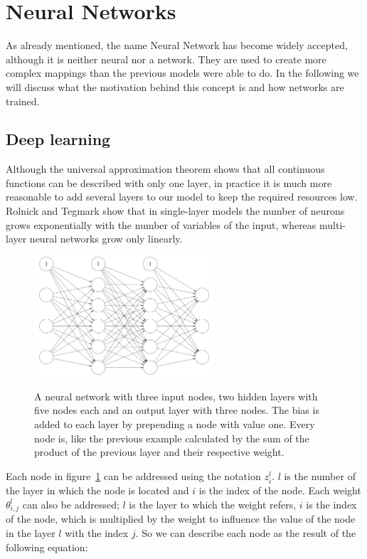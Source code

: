 \section{Neural Networks} \label{ch:neural_networks}

As already mentioned, the name Neural Network has become widely accepted, although it is neither neural nor a network.
They are used to create more complex mappings than the previous models were able to do.
In the following we will discuss what the motivation behind this concept is and how networks are trained.

\subsection{Deep learning} \label{ch:deep_learning}

Although the universal approximation theorem shows that all continuous functions can be described with only one layer, in practice it is much more reasonable to add several layers to our model to keep the required resources low.
Rolnick and Tegmark \cite{Rolnick2017} show that in single-layer models the number of neurons grows exponentially with the number of variables of the input, whereas multi-layer neural networks grow only linearly.

\begin{figure}
    \centering
    \caption{ A neural network with three input nodes, two hidden layers with five nodes each and an output layer with three nodes. The bias is added to each layer by prepending a node with value one. Every node is, like the previous example calculated by the sum of the product of the previous layer and their respective weight.  }
    \includegraphics[width=0.6\textwidth]{images/2_nn_with_bias.png}
    \label{fig:nn}
\end{figure}

Each node in figure~\ref{fig:nn} can be addressed using the notation $z^l_i$.
$l$ is the number of the layer in which the node is located and $i$ is the index of the node.
Each weight $\theta^l_{i, j}$ can also be addressed; $l$ is the layer to which the weight refers, $i$ is the index of the node, which is multiplied by the weight to influence the value of the node in the layer $l$ with the index $j$.
So we can describe each node as the result of the following equation:

